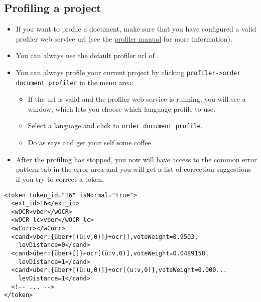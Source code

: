 \subsection{Profiling a project}
\begin{frame}
	\begin{itemize}
		\item If you want to profile a document, make sure that you have
			configured a valid profiler web service url (see the
			\href{https://github.com/cisocrgroup/Resources/blob/master/manuals/profiler-manual.md}{profiler
			manual} for more information).
		\item You can always use the default profiler url of \pocoto{}.
		\item You can always profile your current project by clicking
			\texttt{profiler->order document profiler} in the menu area:
					\begin{itemize}
						\item If the url is valid and the profiler web service is running, you
							will see a window, which lets you choose which language profile
							to use.
						\item Select a language and click to \texttt{order document profile}.
						\item Do as \pocoto{} says and get your self some coffee.
					\end{itemize}
				\item After the profiling has stopped, you now will have access to the
					common error pattern tab in the error area and you will get a list
					of correction suggestions if you try to correct a token.
	\end{itemize}
\end{frame}

\begin{frame}[fragile]
	\begin{verbatim}
<token token_id="16" isNormal="true">
  <ext_id>16</ext_id>
  <wOCR>vber</wOCR>
  <wOCR_lc>vber</wOCR_lc>
  <wCorr></wCorr>
  <cand>vber:{über+[(ü:v,0)]}+ocr[],voteWeight=0.9503,
    levDistance=0</cand>
  <cand>über:{über+[]}+ocr[(ü:v,0)],voteWeight=0.0489158,
    levDistance=1</cand>
  <cand>uber:{über+[(ü:u,0)]}+ocr[(u:v,0)],voteWeight=0.000...
    levDistance=1</cand>
  <!-- ... -->
</token>\end{verbatim}
\end{frame}



